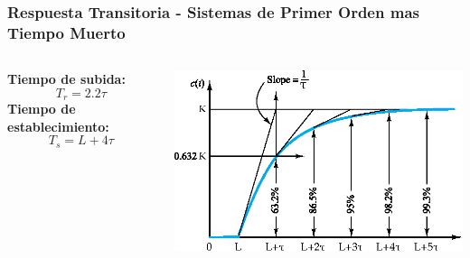 \documentclass[aspectratio=169,handout]{beamer}
\theoremstyle{definition}
\theoremstyle{plain}
\theoremstyle{remark}
\begin{document}
\begin{frame}[<-+>]\frametitle{Respuesta Transitoria - Sistemas de Primer Orden mas Tiempo Muerto}
\vspace*{3mm}
\begin{columns}
 \begin{column}{0.3\textwidth}
 \textbf{Tiempo de subida:}
 \begin{equation*}
   T_r = 2.2 \tau
 \end{equation*}
 \textbf{Tiempo de establecimiento:}
 \begin{equation*}
  T_s = L + 4 \tau
 \end{equation*}
 \end{column} 
 \begin{column}{0.7\textwidth}
  \centering
  \includegraphics[width=10cm]{images/firstOrder+deadTimeResponse.eps}
 \end{column} 
\end{columns}
\end{frame}
\end{document}
